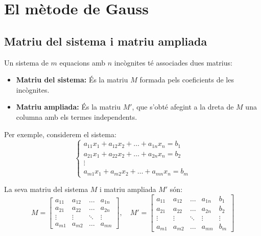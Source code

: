 \documentclass[12pt]{article}
\begin{document}
\newpage

\section{El mètode de Gauss}

\subsection{Matriu del sistema i matriu ampliada}
\begin{concept}
Un sistema de \(m\) equacions amb \(n\) incògnites té associades dues matrius:
\begin{itemize}
    \item \textbf{Matriu del sistema:} És la matriu \(M\) formada pels coeficients de les incògnites.
    \item \textbf{Matriu ampliada:} És la matriu \(M'\), que s'obté afegint a la dreta de \(M\) una columna amb els termes independents.
\end{itemize}

Per exemple, considerem el sistema:
\[
\begin{cases}
a_{11}x_1 + a_{12}x_2 + \dots + a_{1n}x_n = b_1 \\
a_{21}x_1 + a_{22}x_2 + \dots + a_{2n}x_n = b_2 \\
\vdots \\
a_{m1}x_1 + a_{m2}x_2 + \dots + a_{mn}x_n = b_m
\end{cases}
\]

La seva matriu del sistema \(M\) i matriu ampliada \(M'\) són:
\[
M = 
\begin{bmatrix}
a_{11} & a_{12} & \dots & a_{1n} \\
a_{21} & a_{22} & \dots & a_{2n} \\
\vdots & \vdots & \ddots & \vdots \\
a_{m1} & a_{m2} & \dots & a_{mn}
\end{bmatrix}, \quad
M' = 
\begin{bmatrix}
a_{11} & a_{12} & \dots & a_{1n} & b_1 \\
a_{21} & a_{22} & \dots & a_{2n} & b_2 \\
\vdots & \vdots & \ddots & \vdots & \vdots \\
a_{m1} & a_{m2} & \dots & a_{mn} & b_m
\end{bmatrix}
\]
\end{concept}
\end{document}
